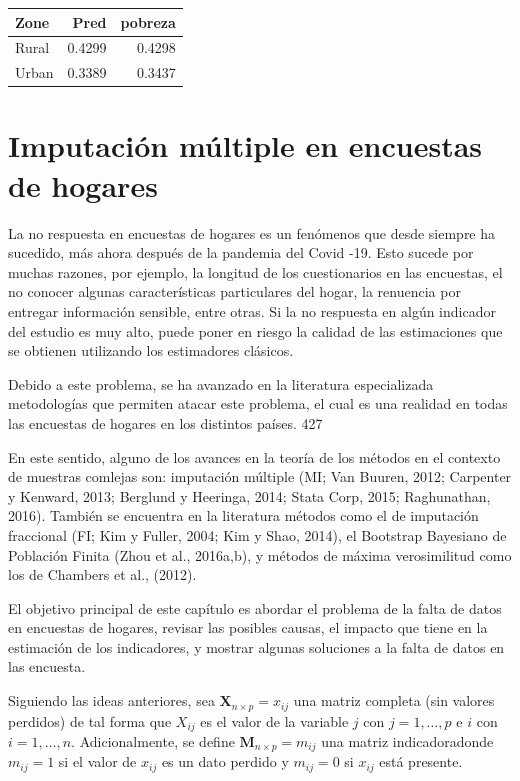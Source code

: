 \documentclass[
  12pt,
]{book}
\begin{document}
\begin{tabular}{l|r|r}
\hline
Zone & Pred & pobreza\\
\hline
Rural & 0.4299 & 0.4298\\
\hline
Urban & 0.3389 & 0.3437\\
\hline
\end{tabular}

\chapter{Imputación múltiple en encuestas de hogares}\label{imputaciuxf3n-muxfaltiple-en-encuestas-de-hogares}

La no respuesta en encuestas de hogares es un fenómenos que desde siempre ha sucedido, más ahora después de la pandemia del Covid -19. Esto sucede por muchas razones, por ejemplo, la longitud de los cuestionarios en las encuestas, el no conocer algunas características particulares del hogar, la renuencia por entregar información sensible, entre otras. Si la no respuesta en algún indicador del estudio es muy alto, puede poner en riesgo la calidad de las estimaciones que se obtienen utilizando los estimadores clásicos.

Debido a este problema, se ha avanzado en la literatura especializada metodologías que permiten atacar este problema, el cual es una realidad en todas las encuestas de hogares en los distintos países. 427

En este sentido, alguno de los avances en la teoría de los métodos en el contexto de muestras comlejas son: imputación múltiple (MI; Van Buuren, 2012; Carpenter y Kenward, 2013; Berglund y Heeringa, 2014; Stata Corp, 2015; Raghunathan, 2016). También se encuentra en la literatura métodos como el de imputación fraccional (FI; Kim y Fuller, 2004; Kim y Shao, 2014), el Bootstrap Bayesiano de Población Finita (Zhou et al., 2016a,b), y métodos de máxima verosimilitud como los de Chambers et al., (2012).

El objetivo principal de este capítulo es abordar el problema de la falta de datos en encuestas de hogares, revisar las posibles causas, el impacto que tiene en la estimación de los indicadores, y mostrar algunas soluciones a la falta de datos en las encuesta.

Siguiendo las ideas anteriores, sea \(\boldsymbol{X}_{n \times p} = x_{ij}\) una matriz completa (sin valores perdidos) de tal forma que \(X_{ij}\) es el valor de la variable \(j\) con \(j=1, \dots, p\) e \(i\) con \(i=1, \dots, n\). Adicionalmente, se define \(\boldsymbol{M}_{n \times p} = m_{ij}\) una matriz indicadoradonde \(m_{ij} = 1\) si el valor de \(x_{ij}\) es un dato perdido y \(m_{ij}=0\) si \(x_{ij}\) está presente.
\end{document}
